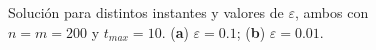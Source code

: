 \begin{figure}[h!]
	\centering
	\caption{Solución para distintos instantes y valores de $\varepsilon$, ambos con $n=m=200$ y $t_{max}=10$. (\textbf{a}) $\varepsilon =0.1$;  (\textbf{b}) $\varepsilon =0.01$.}
	\label{mittal}
\end{figure}

